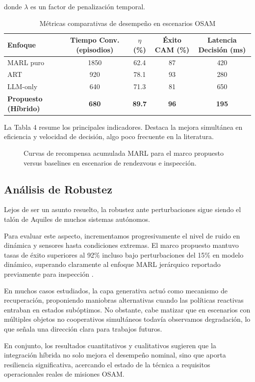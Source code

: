 donde $\lambda$ es un factor de penalización temporal.

\begin{table}[t]
\centering
\caption{Métricas comparativas de desempeño en escenarios OSAM}
\label{tab:performance_metrics}
\begin{tabular}{lcccc}
\hline
Enfoque & Tiempo Conv. (episodios) & $\eta$ (\%) & Éxito CAM (\%) & Latencia Decisión (ms) \\
\hline
MARL puro & 1850 & 62.4 & 87 & 420 \\
ART \cite{Guffanti2024_ART} & 920 & 78.1 & 93 & 280 \\
LLM-only & 640 & 71.3 & 81 & 650 \\
\textbf{Propuesto (Híbrido)} & \textbf{680} & \textbf{89.7} & \textbf{96} & \textbf{195} \\
\hline
\end{tabular}
\end{table}

La Tabla 4 resume los principales indicadores. Destaca la mejora simultánea en eficiencia y velocidad de decisión, algo poco frecuente en la literatura.

\begin{figure}[t]
\centering
\scalebox{0.5}{}
\caption{Curvas de recompensa acumulada MARL para el marco propuesto versus baselines en escenarios de rendezvous e inspección.}
\label{fig:reward_curves}
\end{figure}

\subsection{Análisis de Robustez}

Lejos de ser un asunto resuelto, la robustez ante perturbaciones sigue siendo el talón de Aquiles de muchos sistemas autónomos. 

Para evaluar este aspecto, incrementamos progresivamente el nivel de ruido en dinámica y sensores hasta condiciones extremas. El marco propuesto mantuvo tasas de éxito superiores al 92\% incluso bajo perturbaciones del 15\% en modelo dinámico, superando claramente al enfoque MARL jerárquico reportado previamente para inspección \cite{Lei2022_MARL_Inspection}.

En muchos casos estudiados, la capa generativa actuó como mecanismo de recuperación, proponiendo maniobras alternativas cuando las políticas reactivas entraban en estados subóptimos. No obstante, cabe matizar que en escenarios con múltiples objetos no cooperativos simultáneos todavía observamos degradación, lo que señala una dirección clara para trabajos futuros.

En conjunto, los resultados cuantitativos y cualitativos sugieren que la integración híbrida no solo mejora el desempeño nominal, sino que aporta resiliencia significativa, acercando el estado de la técnica a requisitos operacionales reales de misiones OSAM.